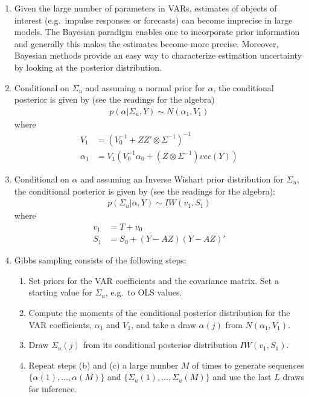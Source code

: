 \begin{enumerate}

\item
Given the large number of parameters in VARs,
  estimates of objects of interest (e.g.\ impulse responses or forecasts)
  can become imprecise in large models.
The Bayesian paradigm enables one to incorporate prior information
  and generally this makes the estimates become more precise.
Moreover, Bayesian methods provide an easy way to characterize estimation uncertainty
  by looking at the posterior distribution.

\item
Conditional on \(\Sigma_u\) and assuming a normal prior for \(\alpha \),
  the conditional posterior is given by (see the readings for the algebra)
\begin{align*}
p(\alpha|\Sigma_u,Y) \sim N(\alpha_1,V_1)
\end{align*}
where
\begin{align*}
V_1 &= {(V_0^{-1}+ZZ' \otimes \Sigma^{-1})}^{-1}
\\
\alpha_1 &= V_1 (V_0^{-1} \alpha_0 + (Z \otimes \Sigma^{-1})vec(Y))
\end{align*}

\item
Conditional on \(\alpha \) and assuming an Inverse Wishart prior distribution for \(\Sigma_u\),
  the conditional posterior is given by (see the readings for the algebra):
\begin{align*}
p(\Sigma_u|\alpha,Y) \sim IW(v_1, S_1)
\end{align*}
where
\begin{align*}
v_1 &= T + v_0
\\
S_1 &= S_0 + (Y - AZ)(Y - AZ)'
\end{align*}

\item
Gibbs sampling consists of the following steps:
\begin{enumerate}
\item Set priors for the VAR coefficients and the covariance matrix.
Set a starting value for \(\Sigma_u\), e.g.\ to OLS values.
\item Compute the moments of the conditional posterior distribution for the VAR coefficients,
  \(\alpha_1\) and \(V_1\), and take a draw \(\alpha(j)\) from \(N(\alpha_1,V_1)\).
\item Draw \(\Sigma_u(j)\) from its conditional posterior distribution \(IW(v_1,S_1)\).
\item Repeat steps (b) and (c) a large number \(M\) of times to generate sequences
  \( \{ \alpha(1),\ldots,\alpha(M) \} \) and \( \{\Sigma_u(1),\ldots,\Sigma_u(M)\} \)
  and use the last \(L\) draws for inference.
\end{enumerate}


\end{enumerate}
